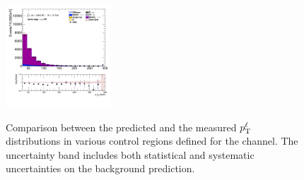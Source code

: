 \begin{figure}[!htp]
\begin{center}
			\includegraphics[width=0.35\textwidth]{chapters/chapter6_HPlus/images/taulep/lep_0_pt_SS_TAUMU.png} \\
			\end{center}
			\caption{
			Comparison between the predicted and the measured $p_{\text{T}}^{\ell}$ distributions in various control regions defined for the \taulep channel. The uncertainty band includes both statistical and systematic uncertainties on the background prediction. 
			}
			\label{fig:bkg-pt-lep-taulep}
		\end{figure}

